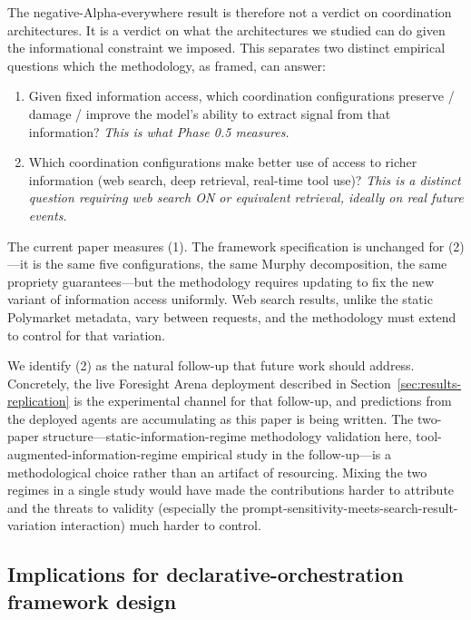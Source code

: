 \documentclass[11pt]{article}
\begin{document}
The negative-Alpha-everywhere result is therefore not a verdict on coordination architectures. It is a verdict on what the architectures we studied can do given the informational constraint we imposed. This separates two distinct empirical questions which the methodology, as framed, can answer:

\begin{enumerate}
\item Given fixed information access, which coordination configurations preserve / damage / improve the model's ability to extract signal from that information? \emph{This is what Phase 0.5 measures.}
\item Which coordination configurations make better use of access to richer information (web search, deep retrieval, real-time tool use)? \emph{This is a distinct question requiring web search ON or equivalent retrieval, ideally on real future events.}
\end{enumerate}

The current paper measures (1). The framework specification is unchanged for (2)---it is the same five configurations, the same Murphy decomposition, the same propriety guarantees---but the methodology requires updating to fix the new variant of information access uniformly. Web search results, unlike the static Polymarket metadata, vary between requests, and the methodology must extend to control for that variation.

We identify (2) as the natural follow-up that future work should address. Concretely, the live Foresight Arena deployment described in Section~\ref{sec:results-replication} is the experimental channel for that follow-up, and predictions from the deployed agents are accumulating as this paper is being written. The two-paper structure---static-information-regime methodology validation here, tool-augmented-information-regime empirical study in the follow-up---is a methodological choice rather than an artifact of resourcing. Mixing the two regimes in a single study would have made the contributions harder to attribute and the threats to validity (especially the prompt-sensitivity-meets-search-result-variation interaction) much harder to control.

\subsection{Implications for declarative-orchestration framework design}
\label{sec:discussion-frameworks}
\end{document}
